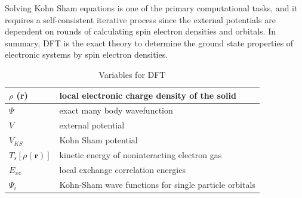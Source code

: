 \documentclass[12 pt]{article}
\begin{document}
  Solving Kohn Sham equations is one of the primary computational tasks, and it requires a self-consistent 
iterative process since the external potentials are dependent on rounds of calculating spin electron densities and 
orbitals. In summary, DFT is the exact theory to determine the ground state properties of electronic systems by 
spin electron densities. \citep {Kotliar2006}  

  \begin{table}[ht]
    \centering
    \caption{Variables for DFT}
    \label{Variables for DFT}
    \vspace{2ex}

  \begin{tabular}{|l|l|}

    \hline
    $\rho$ (\textbf{r}) & local electronic charge density of the solid \\ \hline

    $\Psi$ & exact many body wavefunction \\ \hline

    $V$ & external potential \\ \hline

    $V_{KS}$ & Kohn Sham potential\\ \hline

    $T_s[\rho(\textbf{r})]$ & kinetic energy of noninteracting electron gas \\ \hline

    $E_{xc}$ & local exchange correlation energies \\ \hline

    $\Psi_i$ & Kohn-Sham wave functions for single particle orbitals \\ \hline
 
  \end{tabular}

  \end{table}
\end{document}
